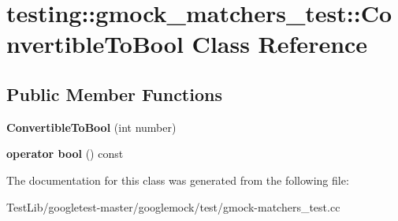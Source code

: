 \hypertarget{classtesting_1_1gmock__matchers__test_1_1ConvertibleToBool}{}\section{testing\+:\+:gmock\+\_\+matchers\+\_\+test\+:\+:Convertible\+To\+Bool Class Reference}
\label{classtesting_1_1gmock__matchers__test_1_1ConvertibleToBool}
\subsection*{Public Member Functions}
\begin{DoxyCompactItemize}
\item 
\mbox{\label{classtesting_1_1gmock__matchers__test_1_1ConvertibleToBool_a4e01a99e144a393bc11a40fb43e8a6f1}} 
{\bfseries Convertible\+To\+Bool} (int number)
\item 
\mbox{\label{classtesting_1_1gmock__matchers__test_1_1ConvertibleToBool_a4ad9766b9d5179a1207af2449405f071}} 
{\bfseries operator bool} () const
\end{DoxyCompactItemize}


The documentation for this class was generated from the following file\+:\begin{DoxyCompactItemize}
\item 
Test\+Lib/googletest-\/master/googlemock/test/gmock-\/matchers\+\_\+test.\+cc\end{DoxyCompactItemize}
